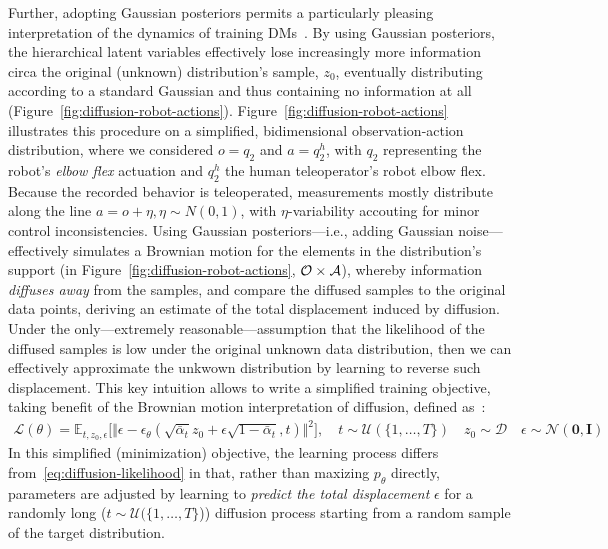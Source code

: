 Further, adopting Gaussian posteriors permits a particularly pleasing interpretation of the dynamics of training DMs~\citep{permenterInterpretingImprovingDiffusion2024}.
By using Gaussian posteriors, the hierarchical latent variables effectively lose increasingly more information circa the original (unknown) distribution's sample, \( z_0 \), eventually distributing according to a standard Gaussian and thus containing no information at all (Figure~\ref{fig:diffusion-robot-actions}).
Figure~\ref{fig:diffusion-robot-actions} illustrates this procedure on a simplified, bidimensional observation-action distribution, where we considered \( o=q_2\) and \( a=q^h_2\), with \( q_2 \) representing the robot's \emph{elbow flex} actuation and \( q^h_2 \) the human teleoperator's robot elbow flex. 
Because the recorded behavior is teleoperated, measurements mostly distribute along the line \( a = o + \eta, \eta \sim N(0,1) \), with \( \eta \)-variability accouting for minor control inconsistencies.
Using Gaussian posteriors---i.e., adding Gaussian noise---effectively simulates a Brownian motion for the elements in the distribution's support (in Figure~\ref{fig:diffusion-robot-actions}, \( \mathcal O \times \mathcal A \)), whereby information \emph{diffuses away} from the samples, and compare the diffused samples to the original data points, deriving an estimate of the total displacement induced by diffusion.
Under the only---extremely reasonable---assumption that the likelihood of the diffused samples is low under the original unknown data distribution, then we can effectively approximate the unkwown distribution by learning to reverse such displacement.
This key intuition allows to write a simplified training objective, taking benefit of the Brownian motion interpretation of diffusion, defined as~\citet{hoDenoisingDiffusionProbabilistic2020}:
\begin{align}\label{eq:diffusion-simplified-loss}
    \mathcal L(\theta) = \mathbb{E}_{t, z_0, \epsilon} \big[
        \Vert \epsilon - \epsilon_\theta(\sqrt{\bar \alpha_t} z_0 + \epsilon \sqrt{1 - \bar \alpha_t}, t) \Vert^2 \big], \quad t \sim \mathcal{U}(\{1,\dots,T\}) \quad
        z_0 \sim \mathcal{D} \quad
        \epsilon \sim \mathcal{N}(\mathbf{0},\mathbf{I})
\end{align}
In this simplified (minimization) objective, the learning process differs from~\ref{eq:diffusion-likelihood} in that, rather than maxizing \( p_\theta \) directly, parameters are adjusted by learning to \emph{predict the total displacement} \( \epsilon \) for a randomly long (\( t \sim \mathcal{U}(\{1,\dots,T\} \))) diffusion process starting from a random sample of the target distribution.
